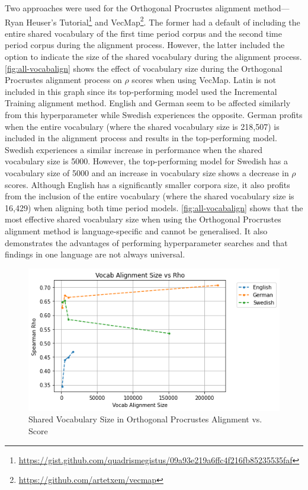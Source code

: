 Two approaches were used for the Orthogonal Procrustes alignment method—Ryan Heuser’s Tutorial\footnote{\url{https://gist.github.com/quadrismegistus/09a93e219a6ffc4f216fb85235535faf}} and VecMap\footnote{\url{https://github.com/artetxem/vecmap}}. The former had a default of including the entire shared vocabulary of the first time period corpus and the second time period corpus during the alignment process. However, the latter included the option to indicate the size of the shared vocabulary during the alignment process. \autoref{fig:all-vocabalign} shows the effect of vocabulary size during the Orthogonal Procrustes alignment process on $\rho$ scores when using VecMap. Latin is not included in this graph since its top-performing model used the Incremental Training alignment method. English and German seem to be affected similarly from this hyperparameter while Swedish experiences the opposite. German profits when the entire vocabulary (where the shared vocabulary size is 218,507) is included in the alignment process and results in the top-performing model. Swedish experiences a similar increase in performance when the shared vocabulary size is 5000. However, the top-performing model for Swedish has a vocabulary size of 5000 and an increase in vocabulary size shows a decrease in $\rho$ scores. Although English has a significantly smaller corpora size, it also profits from the inclusion of the entire vocabulary (where the shared vocabulary size is 16,429) when aligning both time period models. \autoref{fig:all-vocabalign} shows that the most effective shared vocabulary size when using the Orthogonal Procrustes alignment method is language-specific and cannot be generalised. It also demonstrates the advantages of performing hyperparameter searches and that findings in one language are not always universal.

\begin{figure}[h]
  \centering
  \includegraphics[width=.8\linewidth]{sections/figures/vocabalignment_all.png}
  \caption{Shared Vocabulary Size in Orthogonal Procrustes Alignment vs. Score}
  \label{fig:all-vocabalign}
\end{figure}

